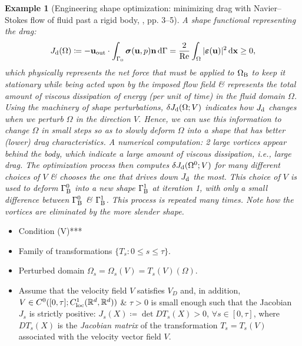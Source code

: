 \documentclass{article}
\newtheorem{example}{Example}
\begin{document}
\begin{example}[Engineering shape optimization: minimizing drag with Navier--Stokes flow of fluid past a rigid body, \cite{Walker2015}, pp. 3--5]
	A shape functional representing the drag:
	\begin{equation}
		J_{\rm d}(\Omega)\coloneqq-{\bf u}_{\rm out}\cdot\int_{\Gamma_0} \boldsymbol{\sigma}({\bf u},p){\bf n}\,{\rm d}\Gamma = \frac{2}{{\rm Re}}\int_\Omega |\boldsymbol{\varepsilon}({\bf u})|^2\,{\rm d}{\bf x}\ge0,
	\end{equation}
	which physically represents the net force that must be applied to $\Omega_{\rm B}$ to keep it stationary while being acted upon by the imposed flow field \& represents the total amount of viscous dissipation of energy (per unit of time) in the fluid domain $\Omega$. Using the machinery of shape perturbations, $\delta J_{\rm d}(\Omega;V)$ indicates how $J_{\rm d}$ changes when we perturb $\Omega$ in the direction $V$. Hence, we can use this information to change $\Omega$ in small steps so as to slowly deform $\Omega$ into a shape that has better (lower) drag characteristics. A numerical computation: 2 large vortices appear behind the body, which indicate a large amount of viscous dissipation, i.e., large drag. The optimization process then computes $\delta J_{\rm d}(\Omega^0;V)$ for many different choices of $V$ \& chooses the one that drives down $J_{\rm d}$ the most. This choice of $V$ is used to deform $\Gamma_{\rm B}^0$ into a new shape $\Gamma_{\rm B}^1$ at iteration 1, with only a small difference between $\Gamma_{\rm B}^0$ \& $\Gamma_{\rm B}^1$. This process is repeated many times. Note how the vortices are eliminated by the more slender shape.
\end{example}

\begin{itemize}
	\item Condition (V)***
	\item Family of transformations $\{T_s:0\le s\le\tau\}$.
	\item Perturbed domain $\Omega_s = \Omega_s(V) = T_s(V)(\Omega)$.
	\item Assume that the velocity field $V$ satisfies $V_D$ and, in addition, $V\in C^0([0,\tau];C_{\rm loc}^1(\mathbb{R}^d,\mathbb{R}^d))$ \& $\tau > 0$ is small enough such that the Jacobian $J_s$ is strictly positive: $J_s(X)\coloneqq\det DT_s(X) > 0$, $\forall s\in[0,\tau]$, where $DT_s(X)$ is the \textit{Jacobian matrix} of the transformation $T_s = T_s(V)$ associated with the velocity vector field $V$.
\end{itemize}
\end{document}
